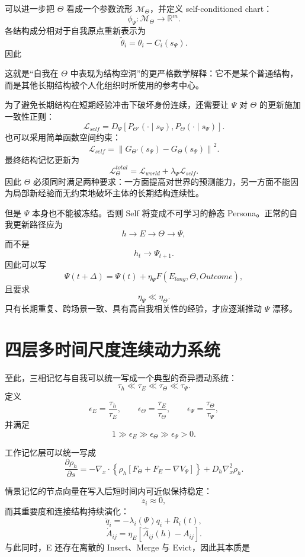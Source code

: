 可以进一步把 $\Theta$ 看成一个参数流形 $\mathcal{M}_\Theta$，并定义 self-conditioned chart：
\[
\phi_\Psi:
\mathcal{M}_\Theta
\rightarrow
\mathbb{R}^{m}.
\]
各结构成分相对于自我原点重新表示为
\[
\widetilde{\theta}_i
=
\theta_i
-
C_i
\left(
s_\Psi
\right).
\]
因此
\begin{statementbox}
\centering
{}
\end{statementbox}
这就是“自我在 $\Theta$ 中表现为结构空洞”的更严格数学解释：它不是某个普通结构，而是其他长期结构被个人化组织时所使用的参考中心。

为了避免长期结构在短期经验冲击下破坏身份连续，还需要让 $\Psi$ 对 $\Theta$ 的更新施加一致性正则：
\[
\mathcal{L}_{self}
=
D_\Psi
\left[
P_{\Theta'}(\cdot\mid s_\Psi),
P_{\Theta}(\cdot\mid s_\Psi)
\right].
\]
也可以采用简单函数空间约束：
\[
\mathcal{L}_{self}
=
\left\|
G_{\Theta'}(s_\Psi)
-
G_{\Theta}(s_\Psi)
\right\|^2.
\]
最终结构记忆更新为
\[
\mathcal{L}_{\Theta}^{total}
=
\mathcal{L}_{world}
+
\lambda_\Psi\mathcal{L}_{self}.
\]
因此 $\Theta$ 必须同时满足两种要求：一方面提高对世界的预测能力，另一方面不能因为局部新经验而无约束地破坏主体的长期结构连续性。

但是 $\Psi$ 本身也不能被冻结。否则 Self 将变成不可学习的静态 Persona。正常的自我更新路径应为
\[
h
\rightarrow
E
\rightarrow
\Theta
\rightarrow
\Psi,
\]
而不是
\[
h_t
\rightarrow
\Psi_{t+1}.
\]
因此可以写
\[
\Psi(t+\Delta)
=
\Psi(t)
+
\eta_\Psi
F
\left(
E_{long},
\Theta,
Outcome
\right),
\]
且要求
\[
\eta_\Psi
\ll
\eta_\Theta.
\]
只有长期重复、跨场景一致、具有高自我相关性的经验，才应逐渐推动 $\Psi$ 漂移。

\section{四层多时间尺度连续动力系统}

至此，三相记忆与自我可以统一写成一个典型的奇异摄动系统：
\[
\tau_h
\ll
\tau_E
\ll
\tau_\Theta
\ll
\tau_\Psi.
\]
定义
\[
\epsilon_E
=
\frac{\tau_h}{\tau_E},
\qquad
\epsilon_\Theta
=
\frac{\tau_E}{\tau_\Theta},
\qquad
\epsilon_\Psi
=
\frac{\tau_\Theta}{\tau_\Psi},
\]
并满足
\[
1
\gg
\epsilon_E
\gg
\epsilon_\Theta
\gg
\epsilon_\Psi
>
0.
\]

工作记忆层可以统一写成
\[
\frac{\partial\rho_h}{\partial s}
=
-
\nabla_x\cdot
\left\{
\rho_h
\left[
F_\Theta
+
F_E
-
\nabla V_\Psi
\right]
\right\}
+
D_h\nabla_x^2\rho_h.
\]

情景记忆的节点向量在写入后短时间内可近似保持稳定：
\[
\dot z_i
\approx
0,
\]
而其重要度和连接结构持续演化：
\[
\dot q_i
=
-\lambda_i(\Psi)q_i
+
R_i(t),
\]
\[
\dot A_{ij}
=
\eta_E
\left[
\widehat{A}_{ij}(h)
-
A_{ij}
\right].
\]
与此同时，E 还存在离散的 Insert、Merge 与 Evict，因此其本质是
\begin{statementbox}
\centering
{}
\end{statementbox}

